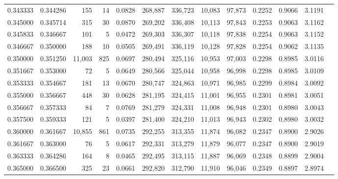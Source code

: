 \begin{tabular}{rrrrrrrrrrrrr}
0.343333 & 0.344286 &    155 &    14 &                                     0.0828 & 268,887 & 336,723 &  10,083 &  97,873 & 0.2252 & 0.9066 & 3.1191 \\
0.345000 & 0.345714 &    315 &    30 &                                     0.0870 & 269,202 & 336,408 &  10,113 &  97,843 & 0.2253 & 0.9063 & 3.1162 \\
0.345833 & 0.346667 &    101 &     5 &                                     0.0472 & 269,303 & 336,307 &  10,118 &  97,838 & 0.2254 & 0.9063 & 3.1152 \\
0.346667 & 0.350000 &    188 &    10 &                                     0.0505 & 269,491 & 336,119 &  10,128 &  97,828 & 0.2254 & 0.9062 & 3.1135 \\
0.350000 & 0.351250 & 11,003 &   825 &                                     0.0697 & 280,494 & 325,116 &  10,953 &  97,003 & 0.2298 & 0.8985 & 3.0116 \\
0.351667 & 0.353000 &     72 &     5 &                                     0.0649 & 280,566 & 325,044 &  10,958 &  96,998 & 0.2298 & 0.8985 & 3.0109 \\
0.353333 & 0.354667 &    181 &    13 &                                     0.0670 & 280,747 & 324,863 &  10,971 &  96,985 & 0.2299 & 0.8984 & 3.0092 \\
0.355000 & 0.356667 &    448 &    30 &                                     0.0628 & 281,195 & 324,415 &  11,001 &  96,955 & 0.2301 & 0.8981 & 3.0051 \\
0.356667 & 0.357333 &     84 &     7 &                                     0.0769 & 281,279 & 324,331 &  11,008 &  96,948 & 0.2301 & 0.8980 & 3.0043 \\
0.357500 & 0.359333 &    121 &     5 &                                     0.0397 & 281,400 & 324,210 &  11,013 &  96,943 & 0.2302 & 0.8980 & 3.0032 \\
0.360000 & 0.361667 & 10,855 &   861 &                                     0.0735 & 292,255 & 313,355 &  11,874 &  96,082 & 0.2347 & 0.8900 & 2.9026 \\
0.361667 & 0.363000 &     76 &     5 &                                     0.0617 & 292,331 & 313,279 &  11,879 &  96,077 & 0.2347 & 0.8900 & 2.9019 \\
0.363333 & 0.364286 &    164 &     8 &                                     0.0465 & 292,495 & 313,115 &  11,887 &  96,069 & 0.2348 & 0.8899 & 2.9004 \\
0.365000 & 0.366500 &    325 &    23 &                                     0.0661 & 292,820 & 312,790 &  11,910 &  96,046 & 0.2349 & 0.8897 & 2.8974 \\

\end{tabular}
